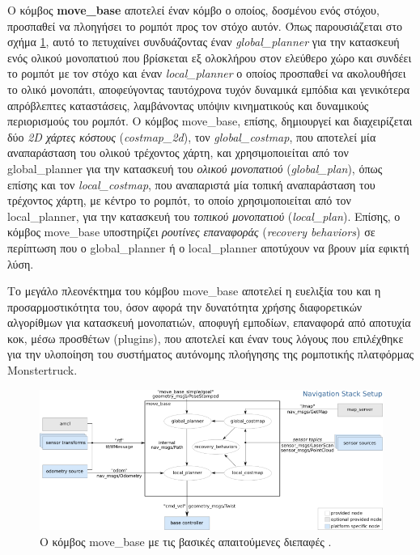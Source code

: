 \bigskip
Ο κόμβος \textbf{move{\_}base} αποτελεί έναν κόμβο ο οποίος, δοσμένου ενός στόχου, προσπαθεί να πλοηγήσει το ρομπότ προς τον στόχο αυτόν. Όπως παρουσιάζεται στο σχήμα \ref{fig:move_base}, αυτό το πετυχαίνει συνδυάζοντας έναν \textit{global{\_}planner} για την κατασκευή ενός ολικού μονοπατιού που βρίσκεται εξ ολοκλήρου στον ελεύθερο χώρο και συνδέει το ρομπότ με τον στόχο και έναν \textit{local{\_}planner} ο οποίος προσπαθεί να ακολουθήσει το ολικό μονοπάτι, αποφεύγοντας ταυτόχρονα τυχόν δυναμικά εμπόδια και γενικότερα απρόβλεπτες καταστάσεις, λαμβάνοντας υπόψιν κινηματικούς και δυναμικούς περιορισμούς του ρομπότ. Ο κόμβος move{\_}base, επίσης, δημιουργεί και διαχειρίζεται δύο \textit{2D χάρτες κόστους} (\textit{costmap{\_}2d}), τον \textit{global{\_}costmap}, που αποτελεί μία αναπαράσταση του ολικού τρέχοντος χάρτη, και χρησιμοποιείται από τον global{\_}planner για την κατασκευή του \textit{ολικού μονοπατιού} (\textit{global{\_}plan}), όπως επίσης και τον \textit{local{\_}costmap}, που αναπαριστά μία τοπική αναπαράσταση του τρέχοντος χάρτη, με κέντρο το ρομπότ, το οποίο χρησιμοποιείται από τον local{\_}planner, για την κατασκευή του \textit{τοπικού μονοπατιού} (\textit{local{\_}plan}). Επίσης, ο κόμβος move{\_}base υποστηρίζει \textit{ρουτίνες επαναφοράς} (\textit{recovery behaviors}) σε περίπτωση που ο global{\_}planner ή ο local{\_}planner αποτύχουν να βρουν μία εφικτή λύση.

\bigskip
Το μεγάλο πλεονέκτημα του κόμβου move{\_}base αποτελεί η ευελιξία του και η προσαρμοστικότητα του, όσον αφορά την δυνατότητα χρήσης διαφορετικών αλγορίθμων για κατασκευή μονοπατιών, αποφυγή εμποδίων, επαναφορά από αποτυχία κοκ, μέσω προσθέτων (plugins), που αποτελεί και έναν τους λόγους που επιλέχθηκε για την υλοποίηση του συστήματος αυτόνομης πλοήγησης της ρομποτικής πλατφόρμας Monstertruck.

\begin{figure}[!ht]
	\centering
	\includegraphics[width=\linewidth]{Chapters/Chapter4/Figures/move_base.png}
	\caption{Ο κόμβος move{\_}base με τις βασικές απαιτούμενες διεπαφές \cite{move_base}.}
	\label{fig:move_base}
\end{figure}


